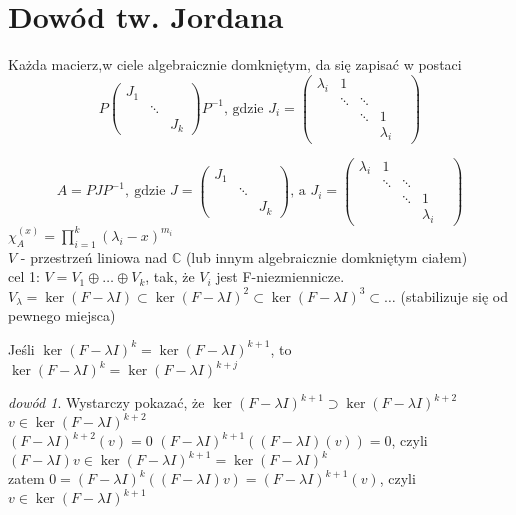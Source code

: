 \documentclass[10pt]{article}
\theoremstyle{definition}
\theoremstyle{definition}
\theoremstyle{definition}
\theoremstyle{definition}
\theoremstyle{remark}
\newtheorem*{dd}{dowód}
\theoremstyle{definition}
\theoremstyle{definition}
\theoremstyle{definition}
\theoremstyle{definition}
\theoremstyle{definition}
\begin{document}
\section{Dowód tw. Jordana} 
\begin{tw}[Jordana]
    Każda macierz,w ciele algebraicznie domkniętym, da się zapisać w postaci 
    \[ P\begin{pmatrix} J_1 & & \\ & \ddots & \\ & & J_k \end{pmatrix}P^{-1}
    \text{, gdzie } J_i = \begin{pmatrix} \lambda_i & 1 & & & \\ & \ddots & \ddots & & \\ 
    & & \ddots & 1 \\ & & &  \lambda_i \end{pmatrix}
    \]
\end{tw} 
\[ A = PJP^{-1}, \ \text{gdzie } J = \begin{pmatrix} J_1 & & \\ & \ddots & \\ & & J_k \end{pmatrix}
\text{, a } J_i = \begin{pmatrix} \lambda_i & 1 & & & \\ & \ddots & \ddots & & \\ 
    & & \ddots & 1 \\ & & &  \lambda_i \end{pmatrix}
\]
$\chi_A^{(x)} = \prod\limits_{i=1}^k (\lambda_i - x)^{m_i}$ \\ 
$V$ - przestrzeń liniowa nad $\mathbb C$ (lub innym algebraicznie domkniętym ciałem) \\
cel 1: 
$V = V_1 \oplus \ldots \oplus V_k$, tak, że $V_i$ jest F-niezmiennicze. \\ 
$V_\lambda = \ker(F-\lambda I) \subset \ker (F - \lambda I)^2 \subset \ker(F - \lambda I)^3 \subset \ldots$ 
(stabilizuje się od pewnego miejsca) 
\begin{ft} 
        Jeśli $\ker(F - \lambda I)^k = \ker (F - \lambda I)^{k+1}$, to $\ker(F - \lambda I)^k = \ker(F - \lambda I)^{k+j}$
\end{ft} 
\begin{dd} 
    Wystarczy pokazać, że $\ker (F - \lambda I)^{k+1} \supset \ker(F - \lambda I)^{k+2}$ \\ 
    $v \in \ker (F - \lambda I)^{k+2}$ \\ 
    $(F - \lambda I)^{k+2} (v) = 0$ 
    $(F - \lambda I)^{k+1} ((F - \lambda I) (v)) = 0$, czyli $(F - \lambda I)v \in 
    \ker(F-\lambda I)^{k+1} = \ker(F - \lambda I)^k$ \\ 
    zatem $0 = (F - \lambda I)^k ((F - \lambda I)v) = (F - \lambda I)^{k+1} (v)$, czyli 
    $v \in \ker(F - \lambda I)^{k+1}$
\end{dd} 
\end{document}
